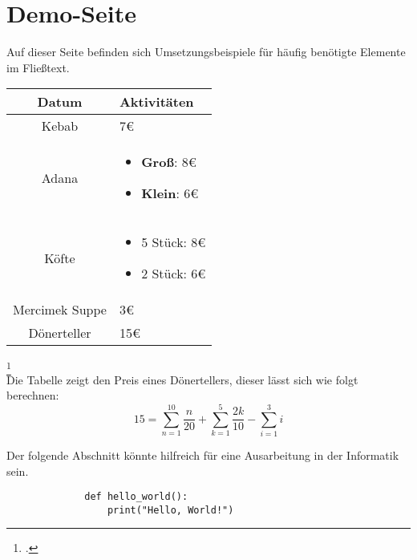 \section{Demo-Seite}
Auf dieser Seite befinden sich Umsetzungsbeispiele für häufig benötigte Elemente im Fließtext.\\

\begin{center}
    \begin{table}[h]
    \centering
    \begin{tabular}{|c|p{6cm}|}
        \hline
        \textbf{Datum} & \textbf{Aktivitäten} \\
        \hline
        Kebab & 7€ \\
        \hline
        Adana & \begin{itemize}
            \item \textbf{Groß}: 8€
            \item \textbf{Klein}: 6€
        \end{itemize} \\
        \hline
        Köfte & \begin{itemize}
            \item 5 Stück: 8€
            \item 2 Stück: 6€
        \end{itemize}\\
        \hline
        Mercimek Suppe & 3€ \\
        \hline
        Dönerteller & 15€ \\
        \hline
    \end{tabular}
    \label{tab:example}
    \end{table}
\end{center}
\footcitetext[Vgl.][]{DemoQuelle}\\ [-4em]

Die Tabelle zeigt den Preis eines Dönertellers, dieser lässt sich wie folgt berechnen:
\begin{equation}
    15 = \sum_{n=1}^{10} \frac{n}{20} + \sum_{k=1}^{5} \frac{2k}{10} - \sum_{i=1}^{3} i
\end{equation}

\newpage
Der folgende Abschnitt könnte hilfreich für eine Ausarbeitung in der Informatik sein.
\begin{figure}[h]
    \begin{lstlisting}
        def hello_world():
            print("Hello, World!")
    \end{lstlisting}
    \label{fig:meincode}
\end{figure}

